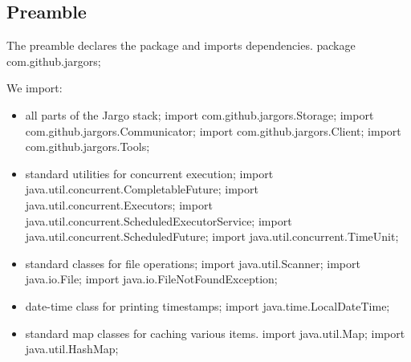 \documentclass{article}
\def\nwendcode{\endtrivlist \endgroup}      %
\let\nwdocspar=\par
\begin{document}
\subsection{Preamble}
\label{sec:preamble}
The preamble declares the package and imports dependencies.
\nwenddocs{}\endmoddef{}
package com.github.jargors;
\nwendcode{}\nwdocspar
We import:
\begin{itemize}
\item all parts of the Jargo stack;
\nwenddocs{}\plusendmoddef
import com.github.jargors.Storage;
import com.github.jargors.Communicator;
import com.github.jargors.Client;
import com.github.jargors.Tools;
\nwendcode{}\item standard utilities for concurrent execution;
\nwenddocs{}\plusendmoddef
import java.util.concurrent.CompletableFuture;
import java.util.concurrent.Executors;
import java.util.concurrent.ScheduledExecutorService;
import java.util.concurrent.ScheduledFuture;
import java.util.concurrent.TimeUnit;
\nwendcode{}\item standard classes for file operations;
\nwenddocs{}\plusendmoddef
import java.util.Scanner;
import java.io.File;
import java.io.FileNotFoundException;
\nwendcode{}\item date-time class for printing timestamps;
\nwenddocs{}\plusendmoddef
import java.time.LocalDateTime;
\nwendcode{}\item standard map classes for caching various items.
\nwenddocs{}\plusendmoddef
import java.util.Map;
import java.util.HashMap;
\nwendcode{}\nwdocspar
\end{itemize}
\end{document}
